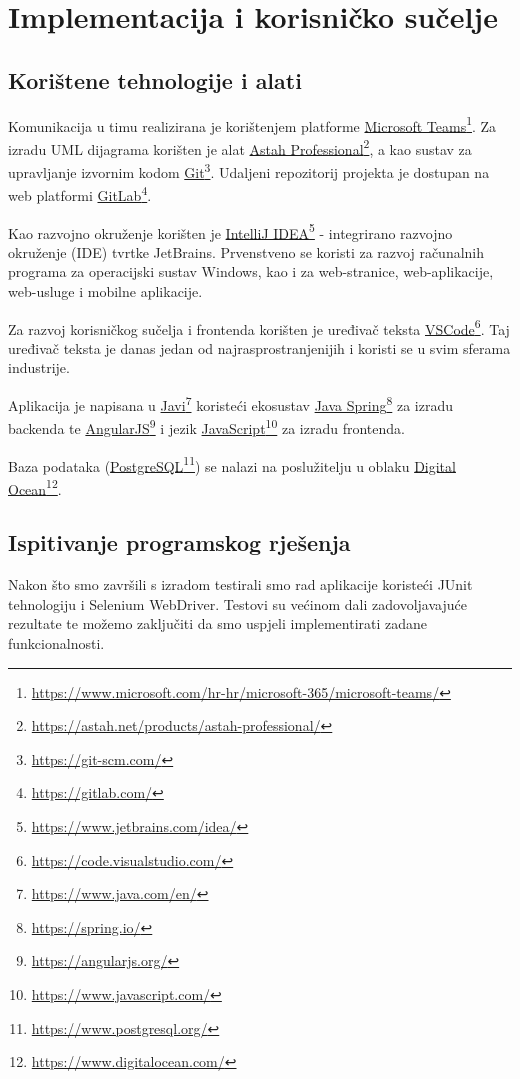 \chapter{Implementacija i korisničko sučelje}
		
		
		\section{Korištene tehnologije i alati}
		
			
			Komunikacija u timu realizirana je korištenjem platforme \underline{Microsoft Teams}\footnote{\url{https://www.microsoft.com/hr-hr/microsoft-365/microsoft-teams/}}. 
			Za izradu UML dijagrama korišten je alat \underline{Astah Professional}\footnote{\url{https://astah.net/products/astah-professional/}}, a kao sustav za upravljanje izvornim kodom \underline{Git}\footnote{\url{https://git-scm.com/}}. 
			Udaljeni repozitorij projekta je dostupan na web platformi \underline{GitLab}\footnote{\url{https://gitlab.com/}}.
			\par
			Kao razvojno okruženje korišten je \underline{IntelliJ IDEA}\footnote{\url{https://www.jetbrains.com/idea/}} - integrirano razvojno okruženje (IDE) tvrtke JetBrains. 
			Prvenstveno se koristi za razvoj računalnih programa za operacijski sustav Windows, kao i za web-stranice, web-aplikacije, web-usluge i mobilne aplikacije.
			\par
			Za razvoj korisničkog sučelja i frontenda korišten je uređivač teksta \underline{VSCode}\footnote{\url{https://code.visualstudio.com/}}. Taj uređivač teksta je danas jedan od najrasprostranjenijih i koristi se u svim sferama industrije. 
            \par
            Aplikacija je napisana u \underline{Javi}\footnote{\url{https://www.java.com/en/}} koristeći ekosustav \underline{Java Spring}\footnote{\url{https://spring.io/}} za
            izradu backenda te \underline{AngularJS}\footnote{\url{https://angularjs.org/}} i jezik \underline{JavaScript}\footnote{\url{https://www.javascript.com/}} za izradu frontenda. 
            \par
            Baza podataka (\underline{PostgreSQL}\footnote{\url{https://www.postgresql.org/}}) se nalazi na poslužitelju u oblaku \underline{Digital Ocean}\footnote{\url{https://www.digitalocean.com/}}.

            
            \vspace*{\fill}

			
			\eject
		
	
		\section{Ispitivanje programskog rješenja}
		Nakon što smo završili s izradom testirali smo rad aplikacije koristeći JUnit tehnologiju i Selenium WebDriver. Testovi su većinom dali zadovoljavajuće rezultate te možemo zaključiti da smo uspjeli implementirati zadane funkcionalnosti.
		

